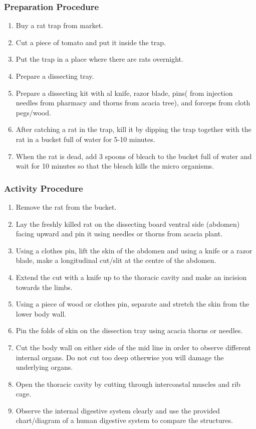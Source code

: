 \subsubsection*{Preparation Procedure}
\begin{enumerate}
\item{Buy a rat trap from market.}
\item{Cut a piece of tomato and put it inside the trap.}
\item{Put the trap in a place where there are rats overnight.}
\item{Prepare a dissecting tray.}
\item{Prepare a dissecting kit with al knife, razor blade, pins( from injection needles from pharmacy and thorns from acacia tree), and forceps from cloth pegs/wood.}
\item{After catching a rat in the trap, kill it by dipping the trap together with the rat in a bucket full of water for 5-10 minutes.}
\item{When the rat is dead, add 3 spoons of bleach to the bucket full of water and wait for 10 minutes so that the bleach kills the micro organisms.}
\end{enumerate}

\subsubsection*{Activity Procedure}
\begin{enumerate}
\item{Remove the rat from the bucket.}
\item{Lay the freshly killed rat on the dissecting board ventral side (abdomen) facing upward and pin it using needles or thorns from acacia plant.}
\item{Using a clothes pin, lift the skin of the abdomen and using a knife or a razor blade, make a longitudinal cut/slit at the centre of the abdomen.}
\item{Extend the cut with a knife up to the thoracic cavity and make an incision towards the limbs.}
\item{Using a piece of wood or clothes pin, separate and stretch the skin from the lower body wall.}
\item{Pin the folds of skin on the dissection tray using acacia thorns or needles.}
\item{Cut the body wall on either side of the mid line in order to observe different internal organs. Do not cut too deep otherwise you will damage the underlying organs.}
\item{Open the thoracic cavity by cutting through intercoastal muscles and rib cage.}
\item{Observe the internal digestive system clearly and use the provided chart/diagram of a human digestive system to compare the structures.}
\end{enumerate}

